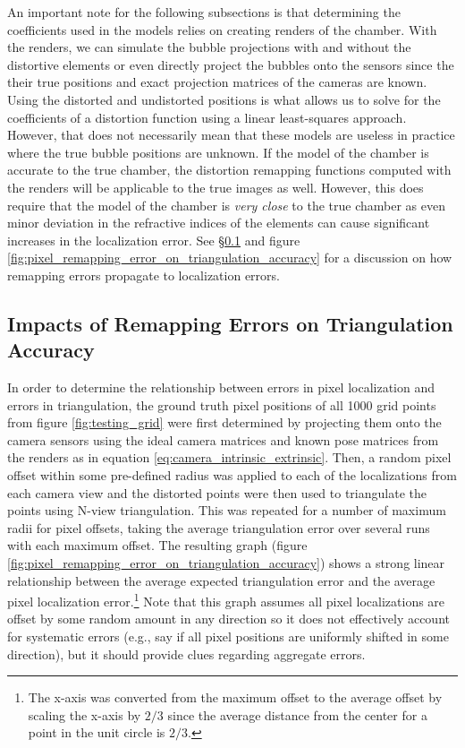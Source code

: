 \documentclass[11pt, letterpaper]{extarticle} %
\begin{document}
An important note for the following subsections is that determining the coefficients used in the models relies on creating renders of the chamber. With the renders, we can simulate the bubble projections with and without the distortive elements or even directly project the bubbles onto the sensors since the their true positions and exact projection matrices of the cameras are known. Using the distorted and undistorted positions is what allows us to solve for the coefficients of a distortion function using a linear least-squares approach. However, that does not necessarily mean that these models are useless in practice where the true bubble positions are unknown. If the model of the chamber is accurate to the true chamber, the distortion remapping functions computed with the renders will be applicable to the true images as well. However, this does require that the model of the chamber is \textit{very close} to the true chamber as even minor deviation in the refractive indices of the elements can cause significant increases in the localization error. See \S\ref{subsec:impacts_of_remapping_errors_on_triangulation_accuracy} and figure \ref{fig:pixel_remapping_error_on_triangulation_accuracy} for a discussion on how remapping errors propagate to localization errors.

\subsection{Impacts of Remapping Errors on Triangulation Accuracy} \label{subsec:impacts_of_remapping_errors_on_triangulation_accuracy}
In order to determine the relationship between errors in pixel localization and errors in triangulation, the ground truth pixel positions of all 1000 grid points from figure \ref{fig:testing_grid} were first determined by projecting them onto the camera sensors using the ideal camera matrices and known pose matrices from the renders as in equation \ref{eq:camera_intrinsic_extrinsic}. Then, a random pixel offset within some pre-defined radius was applied to each of the localizations from each camera view and the distorted points were then used to triangulate the points using N-view triangulation. This was repeated for a number of maximum radii for pixel offsets, taking the average triangulation error over several runs with each maximum offset. The resulting graph (figure \ref{fig:pixel_remapping_error_on_triangulation_accuracy}) shows a strong linear relationship between the average expected triangulation error and the average pixel localization error.\footnote{The x-axis was converted from the maximum offset to the average offset by scaling the x-axis by $2/3$ since the average distance from the center for a point in the unit circle is $2/3$.} Note that this graph assumes all pixel localizations are offset by some random amount in any direction so it does not effectively account for systematic errors (e.g., say if all pixel positions are uniformly shifted in some direction), but it should provide clues regarding aggregate errors.
\end{document}
